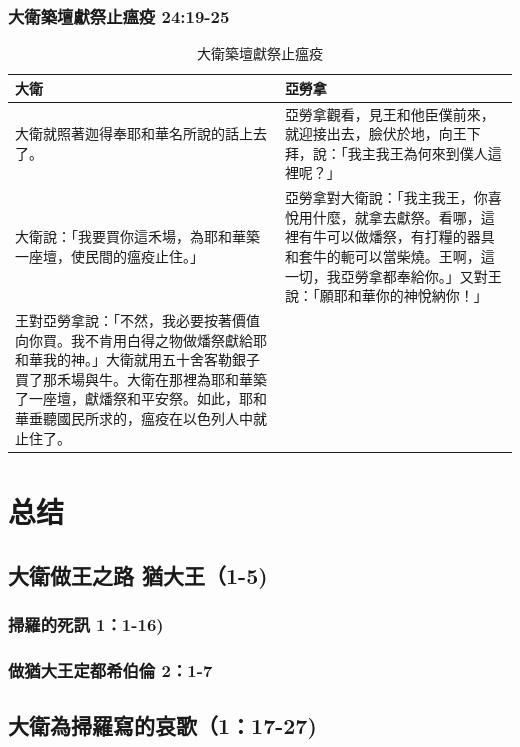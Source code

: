 \subsubsection{大衛築壇獻祭止瘟疫 24:19-25}
\begin{table}[H]
\hspace*{-6mm}
\centering 
\begin{tabular}{p{9.75cm}|p{8.45cm}}\hline\hline
大衛&亞勞拿\\\hline
大衛就照著迦得奉耶和華名所說的話上去了。
&亞勞拿觀看，見王和他臣僕前來，就迎接出去，臉伏於地，向王下拜，說：「我主我王為何來到僕人這裡呢？」\\\hline
大衛說：「我要買你這禾場，為耶和華築一座壇，使民間的瘟疫止住。」&亞勞拿對大衛說：「我主我王，你喜悅用什麼，就拿去獻祭。看哪，這裡有牛可以做燔祭，有打糧的器具和套牛的軛可以當柴燒。王啊，這一切，我亞勞拿都奉給你。」又對王說：「願耶和華你的神悅納你！」 \\\hline
王對亞勞拿說：「不然，我必要按著價值向你買。我不肯用白得之物做燔祭獻給耶和華我的神。」大衛就用五十舍客勒銀子買了那禾場與牛。大衛在那裡為耶和華築了一座壇，獻燔祭和平安祭。如此，耶和華垂聽國民所求的，瘟疫在以色列人中就止住了。&\\\hline
\end{tabular}
\caption{大衛築壇獻祭止瘟疫}
\end{table}








\section{总结}
\subsection{大衛做王之路 猶大王（1-5)}
\subsubsection{掃羅的死訊 1：1-16)}
\subsubsection{做猶大王定都希伯倫 2：1-7}
 
\subsection{大衛為掃羅寫的哀歌（1：17-27)}
